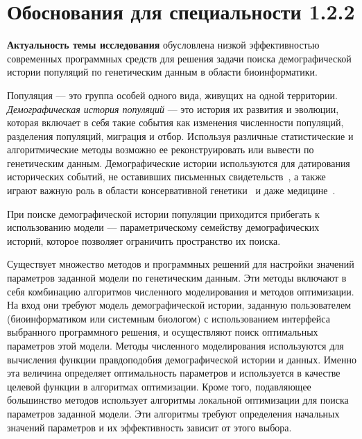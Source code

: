 \documentclass[a4paper,14pt,oneside,openany,article]{memoir}
\begin{document}

\section*{Обоснования для специальности 1.2.2}

\textbf{Актуальность темы исследования} обусловлена низкой эффективностью современных программных средств для решения задачи поиска демографической истории популяций по генетическим данным в области биоинформатики.

Популяция --- это группа особей одного вида, живущих на одной территории.
\textit{Демографическая история популяций} --- это история их развития и эволюции, которая включает в себя такие события как изменения численности популяций, разделения популяций, миграция и отбор.
Используя различные статистические и алгоритмические методы возможно ее реконструировать или вывести по генетическим данным.
Демографические истории используются для датирования исторических событий, не оставивших письменных свидетельств~, а также играют важную роль в области консервативной генетики~ и даже медицине~.

При поиске демографической истории популяции приходится прибегать к использованию модели --- параметрическому семейству демографических историй, которое позволяет ограничить пространство их поиска.

Существует множество методов и программных решений для настройки значений параметров заданной модели по генетическим данным.
Эти методы включают в себя комбинацию алгоритмов численного моделирования и методов оптимизации.
На вход они требуют модель демографической истории, заданную пользователем (биоинформатиком или системным биологом) с использованием интерфейса выбранного программного решения, и осуществляют поиск оптимальных параметров этой модели.
Методы численного моделирования используются для вычисления функции правдоподобия демографической истории и данных.
Именно эта величина определяет оптимальность параметров и используется в качестве целевой функции в алгоритмах оптимизации.
Кроме того, подавляющее большинство методов использует алгоритмы локальной оптимизации для поиска параметров заданной модели.
Эти алгоритмы требуют определения начальных значений параметров и их эффективность зависит от этого выбора. 
\end{document}
